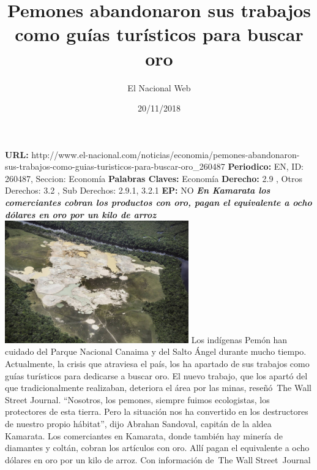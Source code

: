 \documentclass{article}%
\title{\textbf{Pemones abandonaron sus trabajos como guías turísticos para buscar oro}}%
\author{El Nacional Web}%
\date{20/11/2018}%
\begin{document}
%
\normalsize%
\maketitle%
\textbf{URL: }%
http://www.el{-}nacional.com/noticias/economia/pemones{-}abandonaron{-}sus{-}trabajos{-}como{-}guias{-}turisticos{-}para{-}buscar{-}oro\_260487\newline%
%
\textbf{Periodico: }%
EN, %
ID: %
260487, %
Seccion: %
Economía\newline%
%
\textbf{Palabras Claves: }%
Economía\newline%
%
\textbf{Derecho: }%
2.9%
, Otros Derechos: %
3.2%
, Sub Derechos: %
2.9.1, 3.2.1%
\newline%
%
\textbf{EP: }%
NO\newline%
\newline%
%
\textbf{\textit{En Kamarata los comerciantes cobran los productos con oro, pagan el equivalente a ocho dólares en oro por un kilo de arroz}}%
\newline%
\newline%
%
\includegraphics[width=300px]{53.jpg}%
\newline%
%
Los indígenas Pemón han cuidado del Parque Nacional Canaima y del Salto Ángel durante mucho tiempo. Actualmente, la crisis que atraviesa el país, los ha apartado de sus trabajos como guías turísticos para dedicarse a buscar oro.%
\newline%
%
El nuevo trabajo, que los apartó del que tradicionalmente realizaban, deteriora el área por las minas, reseñó~The Wall Street Journal.%
\newline%
%
“Nosotros, los pemones, siempre fuimos ecologistas, los protectores de esta tierra. Pero la situación nos ha convertido en los destructores de nuestro propio hábitat”, dijo Abrahan Sandoval, capitán de la aldea Kamarata.%
\newline%
%
Los comerciantes en Kamarata, donde también hay minería de diamantes y coltán, cobran los artículos con oro. Allí pagan el equivalente a ocho dólares en oro por un kilo de arroz.%
\newline%
%
Con información de~The Wall Street~Journal%
\newline%
%
\end{document}
